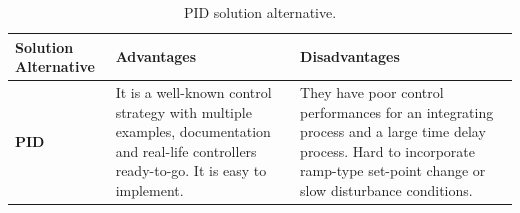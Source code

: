 \documentclass[11pt]{report} %
\begin{document}
\begin{table}[H]
\begin{center}
    \begin{tabular}{M{6.6cm}M{3.3cm}M{3.3cm}}
    \hline
    \textbf{Solution Alternative} & \textbf{Advantages} & \textbf{Disadvantages} \\ 
    \hline
    
    \textbf{PID}

    
    \citep{cite_PID_control}
    
    &
    
    It is a well-known control strategy with multiple examples, documentation and real-life controllers ready-to-go. It is easy to implement.
    
    &
    
    They have poor control performances for an integrating process and a large time delay process. Hard to incorporate ramp-type set-point change or slow disturbance conditions.
    
    \\ \hline
    \end{tabular}
\caption{\label{tab:pid} PID solution alternative.}
\end{center}
\end{table}
\end{document}
